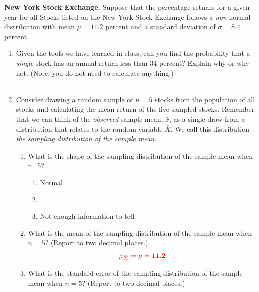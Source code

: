 \item \textbf{New York Stock Exchange.} Suppose that the percentage returns for a given year for all Stocks listed on the New York Stock Exchange follows a \emph{non}-normal distribution with mean $\mu=11.2$ percent and a standard deviation of $\sigma=8.4$ percent.

\begin{enumerate}
\item  Given the tools we have learned in class, can you find the probability that a \emph{single} stock has an annual return less than 34 percent? Explain why or why not. (Note: you do not need to calculate anything.)\\

\\

\item Consider drawing a random sample of $n=5$ stocks from the population of all stocks and calculating the mean return of the five sampled stocks. Remember that we can think of the \emph{observed} sample mean, $\bar{x}$, as a single draw from a distribution that relates to the random variable $\bar{X}$. We call this distribution \textit{the sampling distribution of the sample mean}.

\begin{enumerate}
\item  What is the shape of the sampling distribution of the sample mean when n=5? %
\begin{enumerate}
	\item Normal
	\item {}
	\item Not enough information to tell\\
\end{enumerate}


\item What is the mean of the sampling distribution of the sample mean when $n=5$? (Report to two decimal places.)
\begin{equation*}
{\color{red} \mu_{\bar{X}}=\mu=\mathbf{11.2}}
\end{equation*}


\item  What is the standard error of the sampling distribution of the sample mean when $n=5$? (Report to two decimal places.)


\end{enumerate}
\end{enumerate}
